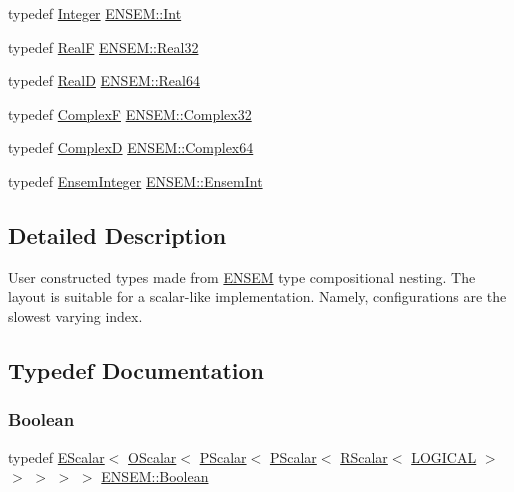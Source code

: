 \begin{DoxyCompactItemize}
\item 
typedef \mbox{\hyperlink{group__defs_gab13d060149cdd80ab40fd8d653f60117}{Integer}} \mbox{\hyperlink{group__defs_ga2cef3ec3b63edbe6be5af6e7be8c7f34}{E\+N\+S\+E\+M\+::\+Int}}
\item 
typedef \mbox{\hyperlink{group__defs_gaaff7cc896fceee5b1ea6ba88497469ab}{RealF}} \mbox{\hyperlink{group__defs_gab601f1c55eb75baed0a0859b3fec6bc1}{E\+N\+S\+E\+M\+::\+Real32}}
\item 
typedef \mbox{\hyperlink{group__defs_ga6436522708cc37b1cb43676ea3b4b2fd}{RealD}} \mbox{\hyperlink{group__defs_gaae0bff35c031375b1ffeb693402496c8}{E\+N\+S\+E\+M\+::\+Real64}}
\item 
typedef \mbox{\hyperlink{group__defs_ga9d343936e63ca257d34c7e2198e549d7}{ComplexF}} \mbox{\hyperlink{group__defs_ga33929081b433314a8e5ae47f774c90b4}{E\+N\+S\+E\+M\+::\+Complex32}}
\item 
typedef \mbox{\hyperlink{group__defs_gaf38ee8c84f090ee0c3b76e7a384fb316}{ComplexD}} \mbox{\hyperlink{group__defs_gade5a0616c06f3019ee74a69dbb42258f}{E\+N\+S\+E\+M\+::\+Complex64}}
\item 
typedef \mbox{\hyperlink{group__defs_gab547eddfe397a7c79b9a4278ab384a2e}{Ensem\+Integer}} \mbox{\hyperlink{group__defs_ga6d7c35bdb86ebd3d266279dd270ccd74}{E\+N\+S\+E\+M\+::\+Ensem\+Int}}
\end{DoxyCompactItemize}


\subsection{Detailed Description}
User constructed types made from \mbox{\hyperlink{namespaceENSEM}{E\+N\+S\+EM}} type compositional nesting. The layout is suitable for a scalar-\/like implementation. Namely, configurations are the slowest varying index. 

\subsection{Typedef Documentation}
\mbox{\label{group__defs_ga38f0cd64d26e121e75367986f2d7cd6c}} 
\subsubsection{\texorpdfstring{Boolean}{Boolean}}
{\footnotesize\ttfamily typedef \mbox{\hyperlink{classENSEM_1_1EScalar}{E\+Scalar}}$<$ \mbox{\hyperlink{classENSEM_1_1OScalar}{O\+Scalar}}$<$ \mbox{\hyperlink{classENSEM_1_1PScalar}{P\+Scalar}}$<$ \mbox{\hyperlink{classENSEM_1_1PScalar}{P\+Scalar}}$<$ \mbox{\hyperlink{classENSEM_1_1RScalar}{R\+Scalar}}$<$ \mbox{\hyperlink{namespaceENSEM_ade7c8d5976e979516f8c2ecd223dd0b6}{L\+O\+G\+I\+C\+AL}} $>$ $>$ $>$ $>$ $>$ \mbox{\hyperlink{group__defs_ga38f0cd64d26e121e75367986f2d7cd6c}{E\+N\+S\+E\+M\+::\+Boolean}}}

